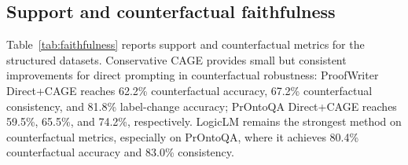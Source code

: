 \documentclass{article}
\begin{document}
\subsection{Support and counterfactual faithfulness}

Table~\ref{tab:faithfulness} reports support and counterfactual metrics for the structured datasets. Conservative CAGE provides small but consistent improvements for direct prompting in counterfactual robustness: ProofWriter Direct+CAGE reaches 62.2\% counterfactual accuracy, 67.2\% counterfactual consistency, and 81.8\% label-change accuracy; PrOntoQA Direct+CAGE reaches 59.5\%, 65.5\%, and 74.2\%, respectively. LogicLM remains the strongest method on counterfactual metrics, especially on PrOntoQA, where it achieves 80.4\% counterfactual accuracy and 83.0\% consistency.
\end{document}
